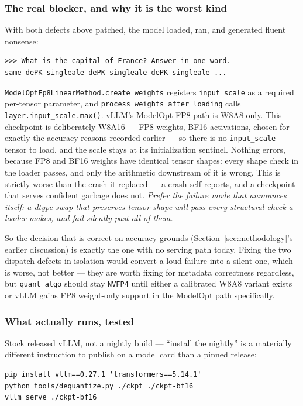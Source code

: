 \documentclass[11pt]{article}
\begin{document}
\subsubsection*{The real blocker, and why it is the worst kind}
With both defects above patched, the model loaded, ran, and generated fluent nonsense:

\begin{lstlisting}
>>> What is the capital of France? Answer in one word.
same dePK singleale dePK singleale dePK singleale ...
\end{lstlisting}

\texttt{ModelOptFp8LinearMethod.create\_weights} registers \texttt{input\_scale} as a
required per-tensor parameter, and \texttt{process\_weights\_after\_loading} calls
\texttt{layer.input\_scale.max()}. vLLM's ModelOpt FP8 path is W8A8 only. This checkpoint
is deliberately W8A16 --- FP8 weights, BF16 activations, chosen for exactly the accuracy
reasons recorded earlier --- so there is no \texttt{input\_scale} tensor to load, and the
scale stays at its initialization sentinel. Nothing errors, because FP8 and BF16 weights
have identical tensor shapes: every shape check in the loader passes, and only the
arithmetic downstream of it is wrong. This is strictly worse than the crash it replaced
--- a crash self-reports, and a checkpoint that serves confident garbage does not.
\emph{Prefer the failure mode that announces itself: a dtype swap that preserves tensor
shape will pass every structural check a loader makes, and fail silently past all of
them.}

So the decision that is correct on accuracy grounds (Section~\ref{sec:methodology}'s
earlier discussion) is exactly the one with no serving path today. Fixing the two
dispatch defects in isolation would convert a loud failure into a silent one, which is
worse, not better --- they are worth fixing for metadata correctness regardless, but
\texttt{quant\_algo} should stay \texttt{NVFP4} until either a calibrated W8A8 variant
exists or vLLM gains FP8 weight-only support in the ModelOpt path specifically.

\subsubsection*{What actually runs, tested}
Stock released vLLM, not a nightly build --- ``install the nightly'' is a materially
different instruction to publish on a model card than a pinned release:

\begin{lstlisting}
pip install vllm==0.27.1 'transformers==5.14.1'
python tools/dequantize.py ./ckpt ./ckpt-bf16
vllm serve ./ckpt-bf16
\end{lstlisting}
\end{document}
